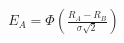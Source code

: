 \documentclass[preview]{standalone}
\begin{document}
\begin{align*}
E_A = \Phi\left(\frac{R_A - R_B}{\sigma\sqrt{2}}\right)
\end{align*}
\end{document}

